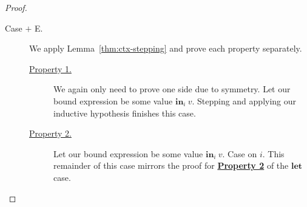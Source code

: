 \begin{proof}
\begin{description}
    \item[Case $+$ E.] 
      We apply Lemma~\ref{thm:ctx-stepping} and prove each property separately.
      \begin{description}
        \item[\underline{Property 1.}]
          We again only need to prove one side due to symmetry. Let our bound
          expression be some value $\textbf{in}_i ~ v$. Stepping and applying
          our inductive hypothesis finishes this case.
        \item[\underline{Property 2.}]
          Let our bound expression be some value $\textbf{in}_i ~ v$. Case on
          $i$. This remainder of this case mirrors the proof for
          \textbf{\underline{Property 2}} of the $\textbf{let}$ case.
      \end{description}

  \end{description}
\end{proof}

%
